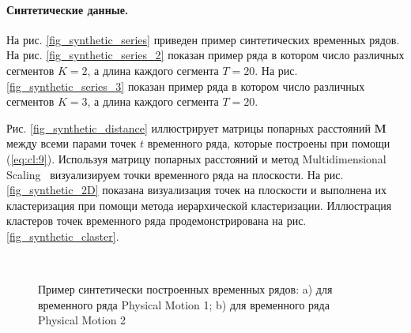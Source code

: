 \paragraph{Синтетические данные.}


На рис. \ref{fig_synthetic_series} приведен пример синтетических временных рядов. 
На рис. \ref{fig_synthetic_series_2} показан пример ряда в котором число различных сегментов $K = 2$, а длина каждого сегмента $T = 20$. 
На рис. \ref{fig_synthetic_series_3} показан пример ряда в котором число различных сегментов $K = 3$, а длина каждого сегмента $T = 20$. 

Рис. \ref{fig_synthetic_distance} иллюстрирует матрицы попарных расстояний $\textbf{M}$ между всеми парами точек $t$ временного ряда, которые построены при помощи (\ref{eq:cl:9}). 
Используя матрицу попарных расстояний и метод Multidimensional Scaling~\cite{Borg2005} визуализируем точки временного ряда на плоскости. 
На рис. \ref{fig_synthetic_2D} показана визуализация точек на плоскости и выполнена их кластеризация при помощи метода иерархической кластеризации. 
Иллюстрация кластеров точек временного ряда продемонстрирована на рис. \ref{fig_synthetic_claster}.

\begin{figure}[h!t]\center
{}
\\
\caption{Пример синтетически построенных временных рядов: a) для временного ряда Physical Motion 1; b) для временного ряда Physical Motion 2}
\label{fig_real_series}
\end{figure}

